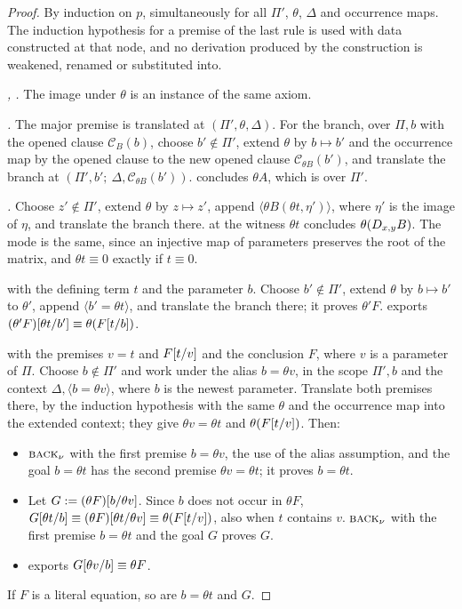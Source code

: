 \begin{proof}
By induction on $p$, simultaneously for all $\Pi'$, $\theta$, $\Delta$ and
occurrence maps. The induction hypothesis for a premise of the last rule is
used with data constructed at that node, and no derivation produced by the
construction is weakened, renamed or substituted into.

\emph{, .} The image under $\theta$ is an
instance of the same axiom.

\emph{.} The major premise is translated at
$(\Pi',\theta,\Delta)$. For the branch, over $\Pi,b$ with the opened clause
$\mathcal C_B(b)$, choose $b'\notin\Pi'$, extend $\theta$ by $b\mapsto b'$
and the occurrence map by the opened clause to the new opened clause
$\mathcal C_{\theta B}(b')$, and translate the branch at
$(\Pi',b';\ \Delta,\mathcal C_{\theta B}(b'))$.  concludes
$\theta A$, which is over $\Pi'$.

\emph{.} Choose $z'\notin\Pi'$, extend $\theta$ by
$z\mapsto z'$, append $\langle\theta B(\theta t,\eta')\rangle$, where
$\eta'$ is the image of $\eta$, and translate the branch there.
 at the witness $\theta t$ concludes $\theta(D_{x,y}B)$.
The mode is the same, since an injective map of parameters preserves the
root of the matrix, and $\theta t\equiv 0$ exactly if $t\equiv 0$.

\emph{} with the defining term $t$ and the parameter $b$.
Choose $b'\notin\Pi'$, extend $\theta$ by $b\mapsto b'$ to $\theta'$,
append $\langle b'=\theta t\rangle$, and translate the branch there; it
proves $\theta'F$.  exports
$(\theta'F)[\theta t/b']\equiv\theta(F[t/b])$.

\emph{} with the premises $v=t$ and $F[t/v]$ and the
conclusion $F$, where $v$ is a parameter of $\Pi$. Choose $b\notin\Pi'$
and work under the alias $b=\theta v$, in the scope $\Pi',b$ and the
context $\Delta,\langle b=\theta v\rangle$, where $b$ is the newest
parameter. Translate both premises there, by the induction hypothesis with
the same $\theta$ and the occurrence map into the extended context; they
give $\theta v=\theta t$ and $\theta(F[t/v])$. Then:
\begin{itemize}
\item $\rulename{Back}_{\nu}$ with the first premise $b=\theta v$, the use
 of the alias assumption, and the goal $b=\theta t$ has the second premise
 $\theta v=\theta t$; it proves $b=\theta t$.
\item Let $G\mathrel{:=}(\theta F)[b/\theta v]$. Since $b$ does not occur
 in $\theta F$, $G[\theta t/b]\equiv(\theta F)[\theta
 t/\theta v]\equiv\theta(F[t/v])$, also when $t$ contains $v$.
 $\rulename{Back}_{\nu}$ with the first premise $b=\theta t$ and the goal
 $G$ proves $G$.
\item {} exports $G[\theta v/b]\equiv\theta F$.
\end{itemize}
If $F$ is a literal equation, so are $b=\theta t$ and $G$.


\end{proof}
